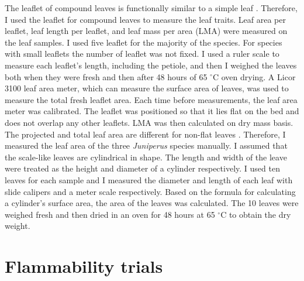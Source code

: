 \documentclass{ttuthes2007}
\begin{document}
The leaflet of compound leaves is functionally similar to a simple leaf \citep{perez2016corrigendum}. Therefore, I used the leaflet for compound leaves to measure the leaf traits. Leaf area per leaflet, leaf length per leaflet, and leaf mass per area (LMA) were measured on the leaf samples. I used five leaflet for the majority of the species. For species with small leaflets the number of leaflet was not fixed.
I used a ruler scale to measure each leaflet's length, including the petiole, and then I weighed the leaves both when they were fresh and then after 48 hours of 65 $^{\circ}$C oven drying. A Licor 3100 leaf area meter, which can measure the surface area of leaves, was used to measure the total fresh leaflet area. Each time before measurements, the leaf area meter was calibrated. The leaflet was positioned so that it lies flat on the bed and does not overlap any other leaflets.   %
LMA was then calculated on  dry mass basis. The projected and total leaf area are different for non-flat leaves \citep{perez2016corrigendum, cornelissen2003handbook}. Therefore, I measured the leaf area of the three \emph{Juniperus} species manually. I assumed that the scale-like leaves
are cylindrical in shape. The length and width of the leave were treated as the height and diameter of a cylinder respectively. I used ten leaves for each sample and I measured the diameter and length of each leaf with slide calipers and a meter scale respectively. Based on the formula for calculating a cylinder's surface area, the area of the leaves was calculated. The 10 leaves were weighed fresh and then dried in an oven for 48 hours at 65 $^{\circ}$C to obtain the dry weight.


\section{Flammability trials}
\end{document}
